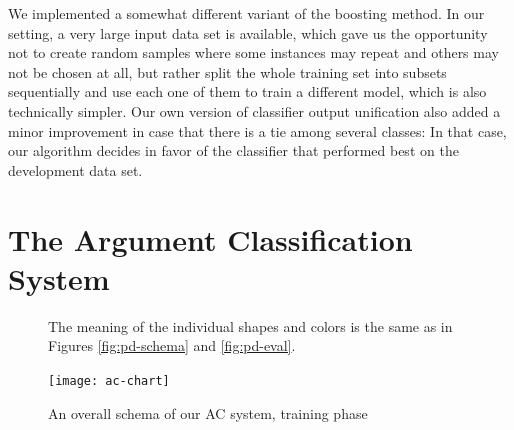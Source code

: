 \documentclass[12pt,notitlepage]{report}
\begin{document}
We implemented a somewhat different variant of the boosting method. In our setting, a very large input data set is available, which gave us the opportunity not to create random samples where some instances may repeat and others may not be chosen at all, but rather split the whole training set into subsets sequentially and use each one of them to train a different model, which is also technically simpler. Our own version of classifier output unification also added a minor improvement in case that there is a tie among several classes: In that case, our algorithm decides in favor of the classifier that performed best on the development data set.

\section{The Argument Classification System}\label{ac-overview}

\begin{figure}[p]\footnotesize
\caption{An overall schema of our AC system, training phase}\label{fig:ac-schema}
\noindent The meaning of the individual shapes and colors is the same as in Figures \ref{fig:pd-schema} and \ref{fig:pd-eval}.
\begin{center}
\texttt{[image: ac-chart]}
\end{center}
\end{figure}
\end{document}
